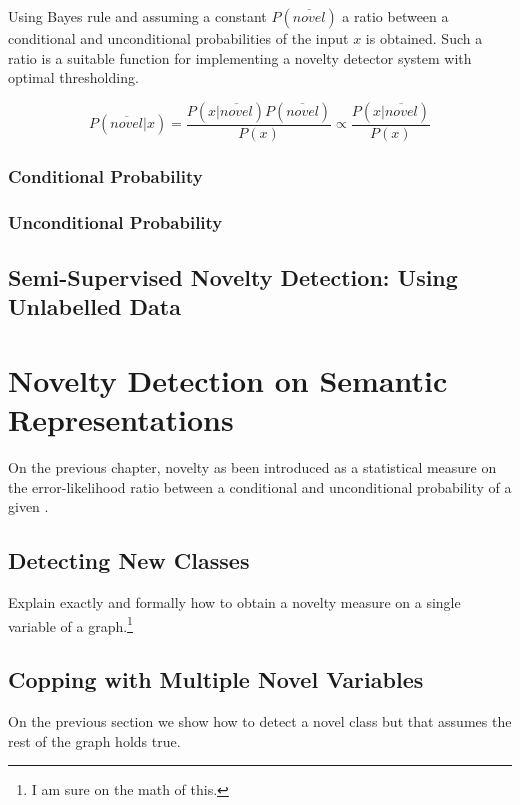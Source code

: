 Using Bayes rule and assuming a constant $P(\overline{novel})$
a ratio between a conditional and unconditional probabilities of the input $x$ is obtained.
Such a ratio is a suitable function for implementing a novelty detector system with optimal
thresholding.

\begin{equation}
\label{eq:novelty-threshold}
          P(\overline{novel}|x)
  =       \frac{P(x|\overline{novel}) P(\overline{novel})}{P(x)}
  \propto \frac{P(x|\overline{novel})}{P(x)}
\end{equation}


\subsection{Conditional Probability}
\subsection{Unconditional Probability}

\section{Semi-Supervised Novelty Detection: Using Unlabelled Data}

\chapter{Novelty Detection on Semantic Representations}\label{chap:novelty}
On the previous chapter, novelty as been introduced as a statistical
measure on the error-likelihood ratio between a conditional and unconditional
probability of a given .


\section{Detecting New Classes}
Explain exactly and formally how to obtain a novelty measure on a single
variable of a graph.\footnote{I am sure on the math of this.}

\section{Copping with Multiple Novel Variables}
On the previous section we show how to detect a novel class but that assumes
the rest of the graph holds true.


